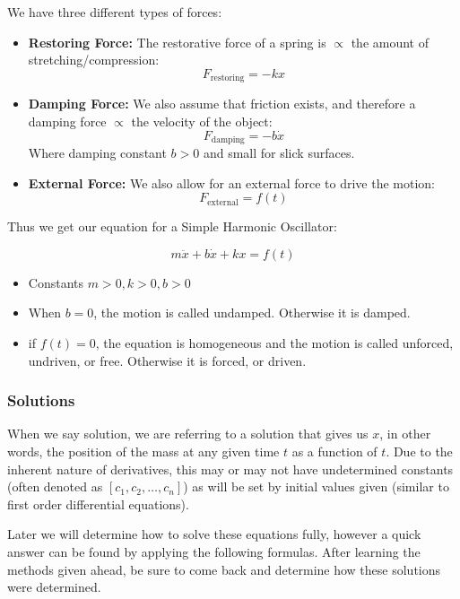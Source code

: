         We have three different types of forces:

            \begin{itemize}
                \item \textbf{Restoring Force:} The restorative force of a spring is $\propto$ the amount of stretching/compression:
                    \[ F_{\text{restoring}} = -k x \]
                \item \textbf{Damping Force:} We also assume that friction exists, and therefore a damping force $\propto$ the velocity of the object:
                    \[ F_{\text{damping}} = -b \dot{x} \]
                    Where damping constant $b > 0$ and small for slick surfaces.
                \item \textbf{External Force:} We also allow for an external force to drive the motion:
                    \[ F_{\text{external}} = f(t) \]
            \end{itemize}

        Thus we get our equation for a Simple Harmonic Oscillator:

            \[ m \ddot{x} + b \dot{x} + kx = f(t) \]

            \begin{itemize}
                \item Constants $m>0, k>0, b>0$
                \item When $b=0$, the motion is called undamped. Otherwise it is damped.
                \item if $f(t)=0$, the equation is homogeneous and the motion is called unforced, undriven, or free. Otherwise it is forced, or driven.
            \end{itemize}

        \subsubsection{Solutions}
        When we say solution, we are referring to a solution that gives us $x$, in other words, the position of the mass at any given time $t$ as a function of $t$. Due to the inherent nature of derivatives, this may or may not have undetermined constants (often denoted as $[c_1, c_2, \dots, c_n]$) as will be set by initial values given (similar to first order differential equations).

        Later we will determine how to solve these equations fully, however a quick answer can be found by applying the following formulas. After learning the methods given ahead, be sure to come back and determine how these solutions were determined.

